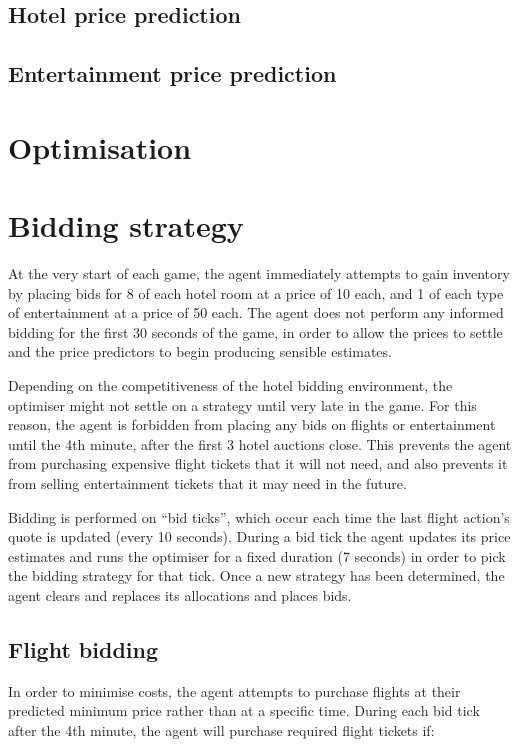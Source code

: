 \documentclass[a4paper]{proc}
\begin{document}
\subsection{Hotel price prediction}

\subsection{Entertainment price prediction}

\section{Optimisation}

\section{Bidding strategy}

At the very start of each game, the agent immediately attempts to gain inventory by placing bids for 8 of each hotel room at a price of 10 each, and 1 of each type of entertainment at a price of 50 each. The agent does not perform any informed bidding for the first 30 seconds of the game, in order to allow the prices to settle and the price predictors to begin producing sensible estimates.

Depending on the competitiveness of the hotel bidding environment, the optimiser might not settle on a strategy until very late in the game. For this reason, the agent is forbidden from placing any bids on flights or entertainment until the 4th minute, after the first 3 hotel auctions close. This prevents the agent from purchasing expensive flight tickets that it will not need, and also prevents it from selling entertainment tickets that it may need in the future.

Bidding is performed on ``bid ticks'', which occur each time the last flight action's quote is updated (every 10 seconds). During a bid tick the agent updates its price estimates and runs the optimiser for a fixed duration (7 seconds) in order to pick the bidding strategy for that tick. Once a new strategy has been determined, the agent clears and replaces its allocations and places bids.

\subsection{Flight bidding}

In order to minimise costs, the agent attempts to purchase flights at their predicted minimum price rather than at a specific time. During each bid tick after the 4th minute, the agent will purchase required flight tickets if:
\end{document}
